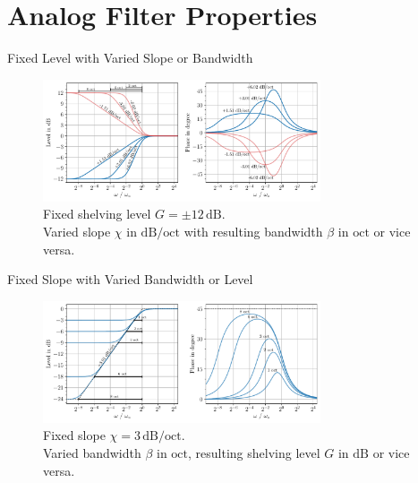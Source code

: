\documentclass[mathserif,aspectratio=169]{beamer}
\newcommand{\tw}{0.73}
\begin{document}
\section{Analog Filter Properties}
\begin{frame}{Fixed Level with Varied Slope or Bandwidth}
\begin{figure}
\captionsetup{width=.65\linewidth}
\includegraphics[width=\tw\textwidth]{../graphics/low-shelving-filter-varying-slope.pdf}
\caption{Fixed shelving level $G=\pm 12\,\mathrm{dB}$.\\
Varied slope $\chi$ in $\mathrm{dB/oct}$ with resulting bandwidth $\beta$ in
$\mathrm{oct}$ or vice versa.}
\label{fig:low-shelving-filter-varying-slope}
\end{figure}
\end{frame}
%
%
%
\begin{frame}{Fixed Slope with Varied Bandwidth or Level}
\begin{figure}
\captionsetup{width=.65\linewidth}
\includegraphics[width=\tw\textwidth]{../graphics/low-shelving-filter-varying-bandwidth.pdf}
\caption{Fixed slope $\chi = 3\,\mathrm{dB/oct.}$\\Varied bandwidth $\beta$
in $\mathrm{oct}$, resulting shelving level $G$ in $\mathrm{dB}$ or vice versa.}
\label{fig:low-shelving-filter-varying-bandwidth}
\end{figure}
\end{frame}
\end{document}
